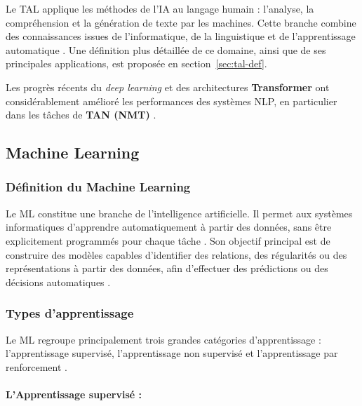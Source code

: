 Le \ac{TAL} applique les méthodes de l'\ac{IA} au langage humain : l'analyse, la compréhension et la génération de texte par les machines. Cette branche combine des connaissances issues de l'informatique, de la linguistique et de l'apprentissage automatique \cite{ranathunga2023neural}. Une définition plus détaillée de ce domaine, ainsi que de ses principales applications, est proposée en section~\ref{sec:tal-def}.

Les progrès récents du \textit{deep learning} et des architectures \textbf{Transformer} ont considérablement amélioré les performances des systèmes \ac{NLP}, en particulier dans les tâches de \textbf{TAN (\ac{NMT})} \cite{vaswani2017attention, ranathunga2023neural, agyei2025dynamic}.

\subsection{Machine Learning}

\subsubsection{Définition du Machine Learning}

Le \ac{ML} constitue une branche de l'intelligence artificielle. Il permet aux systèmes informatiques d'apprendre automatiquement à partir des données, sans être explicitement programmés pour chaque tâche \cite{Goodfellow-et-al-2016}. Son objectif principal est de construire des modèles capables d'identifier des relations, des régularités ou des représentations à partir des données, afin d'effectuer des prédictions ou des décisions automatiques \cite{Goodfellow-et-al-2016}.

\subsubsection{Types d'apprentissage}

Le \ac{ML} regroupe principalement trois grandes catégories d'apprentissage : l'apprentissage supervisé, l'apprentissage non supervisé et l'apprentissage par renforcement \cite{Goodfellow-et-al-2016}.

\paragraph{L'Apprentissage supervisé :}

